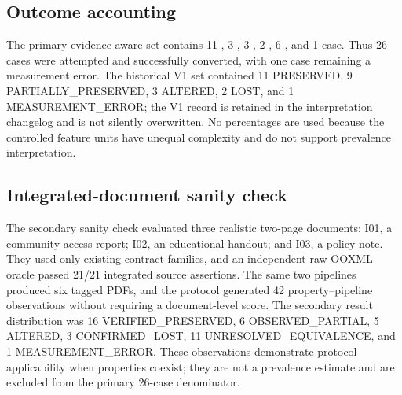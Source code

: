 \subsection{Outcome accounting}

The primary evidence-aware set contains 11 \verifiedpreserved{}, 3 \observedpartial{}, 3 \altered{}, 2 \confirmedlost{}, 6 \unresolved{}, and 1 \measured{} case. Thus 26 cases were attempted and successfully converted, with one case remaining a measurement error. The historical V1 set contained 11 PRESERVED, 9 PARTIALLY\_PRESERVED, 3 ALTERED, 2 LOST, and 1 MEASUREMENT\_ERROR; the V1 record is retained in the interpretation changelog and is not silently overwritten. No percentages are used because the controlled feature units have unequal complexity and do not support prevalence interpretation.

\subsection{Integrated-document sanity check}

The secondary sanity check evaluated three realistic two-page documents: I01, a community access report; I02, an educational handout; and I03, a policy note. They used only existing contract families, and an independent raw-OOXML oracle passed 21/21 integrated source assertions. The same two pipelines produced six tagged PDFs, and the protocol generated 42 property--pipeline observations without requiring a document-level score. The secondary result distribution was 16 VERIFIED\_PRESERVED, 6 OBSERVED\_PARTIAL, 5 ALTERED, 3 CONFIRMED\_LOST, 11 UNRESOLVED\_EQUIVALENCE, and 1 MEASUREMENT\_ERROR. These observations demonstrate protocol applicability when properties coexist; they are not a prevalence estimate and are excluded from the primary 26-case denominator.


